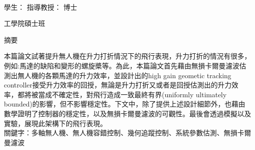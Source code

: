 \newpage
\begin{center}
   \begin{singlespace}
     \large \textbf{\titleCh} \\[0.8cm]
   \end{singlespace}

    學生： \studentCh 
    \hfill
    指導教授： \advisorCh \hspace{0.1cm} 博士 \\[0.5cm]

  \begin{singlespace}
  \large \universityCh  工學院\instituteCh 碩士班 \\[0.5cm]
  \end{singlespace}  

  \LARGE 摘要\\[0.5cm]
\end{center}

\normalsize 
本篇論文試著提升無人機在升力打折情況下的飛行表現，升力打折的情況有很多，例如:馬達的缺陷和變形的螺旋槳等。為此，本篇論文首先藉由無損卡爾曼濾波估測出無人機的各顆馬達的升力效率，並設計出的high gain geometic tracking controller接受升力效率的回授，無論是升力打折又或者是回授估測出的升力效率，都將被當成不確定性，對飛行造成一致最終有界(uniformly ultimately bounded)的影響，但不影響穩定性。下文中，除了提供上述設計細節外，也藉由數學證明了控制器的穩定性，以及無損卡爾曼濾波的可觀性。最後會透過模擬以及實驗，展現此架構下的飛行表現。\\[0.7cm]

關鍵字：多軸無人機、無人機容錯控制、幾何追蹤控制、系統參數估測、無損卡爾曼濾波